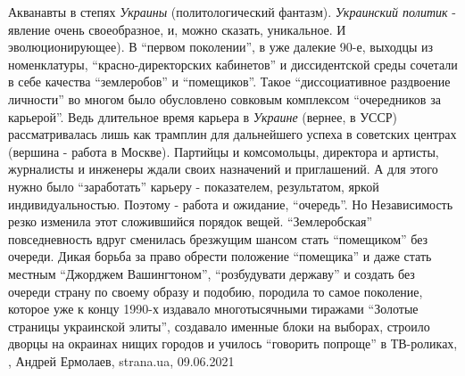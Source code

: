
Акванавты в степях \emph{Украины} (политологический фантазм). \emph{Украинский политик} -
явление очень своеобразное, и, можно сказать, уникальное. И эволюционирующее).
В \enquote{первом поколении}, в уже далекие 90-е, выходцы из номенклатуры,
\enquote{красно-директорских кабинетов} и диссидентской среды сочетали в себе качества
\enquote{землеробов} и \enquote{помещиков}. Такое \enquote{диссоциативное раздвоение личности} во
многом было обусловлено совковым комплексом \enquote{очередников за карьерой}. Ведь
длительное время карьера в \emph{Украине} (вернее, в УССР) рассматривалась лишь как
трамплин для дальнейшего успеха в советских центрах (вершина - работа в
Москве). Партийцы и комсомольцы, директора и артисты, журналисты и инженеры
ждали своих назначений и приглашений. А для этого нужно было \enquote{заработать}
карьеру - показателем, результатом, яркой индивидуальностью. Поэтому - работа и
ожидание, \enquote{очередь}. Но Независимость резко изменила этот сложившийся порядок
вещей. \enquote{Землеробская} повседневность вдруг сменилась брезжущим шансом стать
\enquote{помещиком} без очереди. Дикая борьба за право обрести положение \enquote{помещика} и
даже стать местным \enquote{Джорджем Вашингтоном}, \enquote{розбудувати державу} и создать без
очереди страну по своему образу и подобию, породила то самое поколение, которое
уже к концу 1990-х издавало многотысячными тиражами \enquote{Золотые страницы
украинской элиты}, создавало именные блоки на выборах, строило дворцы на
окраинах нищих городов и училось \enquote{говорить попроще} в ТВ-роликах,
, Андрей Ермолаев, strana.ua, 09.06.2021


